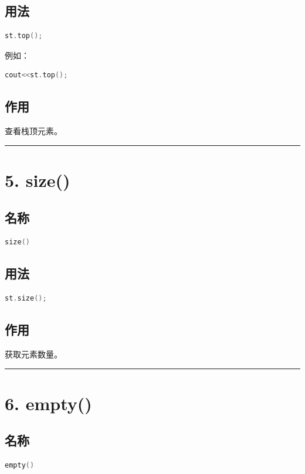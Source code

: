 \documentclass[10pt,twocolumn]{extarticle}
\begin{document}
\subsection{用法}
\begin{lstlisting}[language=C++]
st.top();
\end{lstlisting}
例如：
\begin{lstlisting}[language=C++]
cout<<st.top();
\end{lstlisting}

\subsection{作用}
查看栈顶元素。

\noindent\rule{\linewidth}{0.4pt}

\section{5. size()}

\subsection{名称}
\begin{lstlisting}[language=C++]
size()
\end{lstlisting}

\subsection{用法}
\begin{lstlisting}[language=C++]
st.size();
\end{lstlisting}

\subsection{作用}
获取元素数量。

\noindent\rule{\linewidth}{0.4pt}

\section{6. empty()}

\subsection{名称}
\begin{lstlisting}[language=C++]
empty()
\end{lstlisting}
\end{document}
